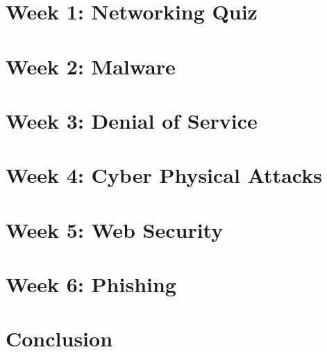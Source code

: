 \documentclass[oneside,openright,titlepage,numbers=noenddot,headinclude,footinclude=true,cleardoublepage=empty,listof=totoc,paper=a4,fontsize=11pt,english,BCOR=5mm]{scrreprt}
\begin{document}
  \frenchspacing
  \raggedbottom{}

  \pagestyle{plain}

  \singlespacing{}
  

  \onehalfspacing{}
  

  \cleardoublepage{}
  \pagestyle{scrheadings}
  \onehalfspacing{}

  \chapter{Week 1: Networking Quiz}\label{c:Week-1}
  

  \chapter{Week 2: Malware}\label{c:Week-2}
  

  \chapter{Week 3: Denial of Service}\label{c:Week-3}
  

  \chapter{Week 4: Cyber Physical Attacks}\label{c:Week-4}
  

  \chapter{Week 5: Web Security}\label{c:Week-5}
  

  \chapter{Week 6: Phishing}\label{c:Week-6}
  

  \chapter{Conclusion}\label{c:Conclusion}
  

  \cleardoublepage{}
  \appendix

  \singlespacing{}
  
  \cleardoublepage{}
\end{document}
